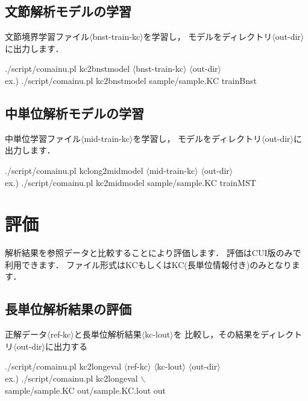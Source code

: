 \documentclass[titlepage]{jarticle}
\begin{document}
\subsection{文節解析モデルの学習}\label{learn_bnst}
文節境界学習ファイル$\langle$bnst-train-kc$\rangle$を学習し，
モデルをディレクトリ$\langle$out-dir$\rangle$に出力します．
\begin{screen}
./script/comainu.pl kc2bnstmodel $\langle$bnst-train-kc$\rangle$ $\langle$out-dir$\rangle$ \\
ex.) ./script/comainu.pl kc2bnstmodel sample/sample.KC trainBnst
\end{screen}


\subsection{中単位解析モデルの学習}
中単位学習ファイル$\langle$mid-train-kc$\rangle$を学習し，
モデルをディレクトリ$\langle$out-dir$\rangle$に出力します．
\begin{screen}
./script/comainu.pl kclong2midmodel $\langle$mid-train-kc$\rangle$ $\langle$out-dir$\rangle$ \\
ex.) ./script/comainu.pl kc2midmodel sample/sample.KC trainMST
\end{screen}

\clearpage

\section{評価}
解析結果を参照データと比較することにより評価します．
評価はCUI版のみで利用できます．
ファイル形式はKCもしくはKC(長単位情報付き)のみとなります．

\subsection{長単位解析結果の評価}\label{eval_long}
正解データ$\langle$ref-kc$\rangle$と長単位解析結果$\langle$kc-lout$\rangle$を
比較し，その結果をディレクトリ$\langle$out-dir$\rangle$に出力する
\begin{screen}
./script/comainu.pl kc2longeval $\langle$ref-kc$\rangle$ $\langle$kc-lout$\rangle$ $\langle$out-dir$\rangle$ \\
ex.) ./script/comainu.pl kc2longeval $\backslash$ \\
\hspace{10mm} sample/sample.KC out/sample.KC.lout out
\end{screen}
\end{document}
